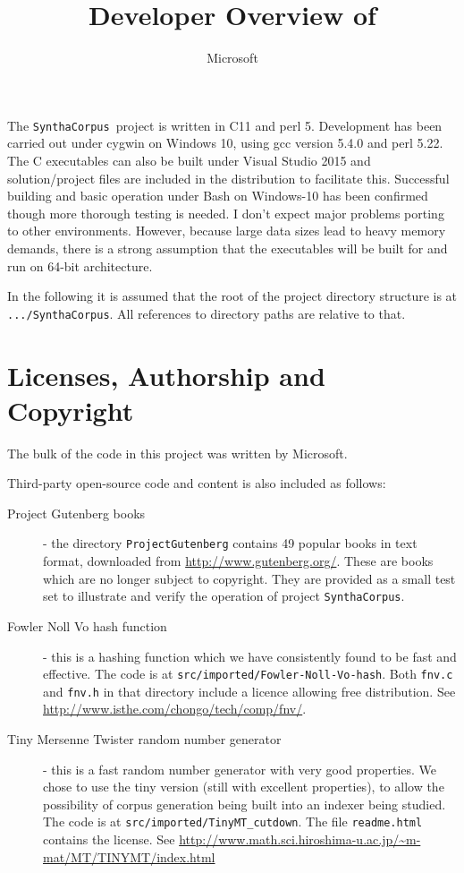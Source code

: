 \documentclass{article}
\title{Developer Overview of \projectName}
\author{Microsoft}
\newcommand{\projectName}{\texttt{SynthaCorpus}}
\newcommand{\projectRoot}{\texttt{.../SynthaCorpus}}
\begin{document}
\maketitle{}

The \projectName~project is written in C11 and perl 5.  Development
has been carried out under cygwin on Windows 10, using gcc version
5.4.0 and perl 5.22.  The C executables can also be built under Visual
Studio 2015 and solution/project files are included in the
distribution to facilitate this.  Successful building and basic
operation under Bash on Windows-10 has been confirmed though more
thorough testing is needed. I don't expect major problems porting to
other environments.  However, because large data sizes lead to heavy
memory demands, there is a strong assumption that the executables will
be built for and run on 64-bit architecture.


In the following it is assumed that the root of the project directory
structure is at \projectRoot.  All references to directory paths are relative to
that.

\section{Licenses, Authorship and Copyright}
The bulk of the code in this project was written by Microsoft.

Third-party open-source code and content is also included as follows:

\begin{description}
  \item [Project Gutenberg books] - the directory
    \texttt{ProjectGutenberg} contains 49 popular books in text
    format, downloaded from \url{http://www.gutenberg.org/}.  These
    are books which are no longer subject to copyright.  They
    are provided as a small test set to illustrate and verify the
    operation of project \projectName.
    \item [Fowler Noll Vo hash function] - this is a hashing function
      which we have consistently found to be fast and effective.  The code
      is at \texttt{src/imported/Fowler-Noll-Vo-hash}.  Both
      \texttt{fnv.c} and \texttt{fnv.h} in that directory include a
      licence allowing free distribution.  See \url{http://www.isthe.com/chongo/tech/comp/fnv/}.
      \item [Tiny Mersenne Twister random number generator] - this is
        a fast random number generator with very good properties.  We
        chose to use the tiny version (still with excellent
        properties), to allow the possibility of corpus generation
          being built into an indexer being studied.  The code is at
          \texttt{src/imported/TinyMT\_cutdown}.  The file
          \texttt{readme.html} contains the license.
          See \url{http://www.math.sci.hiroshima-u.ac.jp/~m-mat/MT/TINYMT/index.html}
      \end{description}
    
\end{document}
